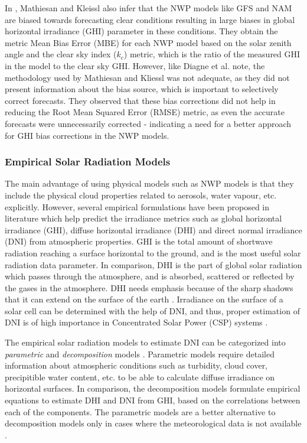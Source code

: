 \par In \cite{litrev_nwp1}, Mathiesan and Kleissl also infer that the NWP models like GFS and NAM are biased towards forecasting clear conditions resulting in large biases in global horizontal irradiance (GHI) parameter in these conditions. They obtain the metric Mean Bias Error (MBE) for each NWP model based on the solar zenith angle and the clear sky index ($k_c$) metric, which is the ratio of the measured GHI in the model to the clear sky GHI. However, like Diagne et al. \cite{litrev_nwp5} note, the methodology used by Mathiesan and Kliessl was not adequate, as they did not present information about the bias source, which is important to selectively correct forecasts. They observed that these bias corrections did not help in reducing the Root Mean Squared Error (RMSE) metric, as even the accurate forecasts were unnecessarily corrected - indicating a need for a better approach for GHI bias corrections in the NWP models.

\subsubsection*{Empirical Solar Radiation Models}
\par The main advantage of using physical models such as NWP models is that they include the physical cloud properties related to aerosols, water vapour, etc. explicitly. However, several empirical formulations have been proposed in literature which help predict the irradiance metrics such as global horizontal irradiance (GHI), diffuse horizontal irradiance (DHI) and direct normal irradiance (DNI) from atmospheric properties. GHI is the total amount of shortwave radiation reaching a surface horizontal to the ground, and is the most useful solar radiation data parameter. In comparison, DHI is the part of global solar radiation which passes through the atmosphere, and is absorbed, scattered or reflected by the gases in the atmosphere. DHI needs emphasis because of the sharp shadows that it can extend on the surface of the earth \cite{litrev_pvlib1}. Irradiance on the surface of a solar cell can be determined with the help of DNI, and thus, proper estimation of DNI is of high importance in Concentrated Solar Power (CSP) systems \cite{litrev_pvlib2}.

\par The empirical solar radiation models to estimate DNI can be categorized into \textit{parametric} and \textit{decomposition} models \cite{litrev_pvlib3}. Parametric models require detailed information about atmospheric conditions such as turbidity, cloud cover, precipitible water content, etc. to be able to calculate diffuse irradiance on horizontal surfaces. In comparison, the decomposition models formulate empirical equations to estimate DHI and DNI from GHI, based on the correlations between each of the components. The parametric models are a better alternative to decomposition models only in cases where the meteorological data is not available \cite{litrev_pvlib3}\cite{litrev_pvlib4}.

